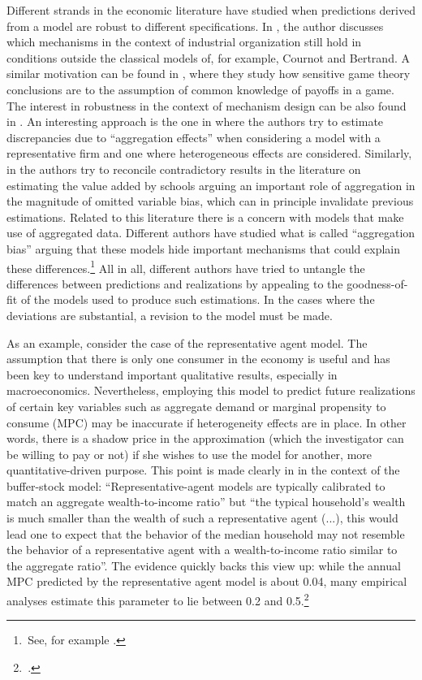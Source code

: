\documentclass[english, a4paper, 12pt]{article}
\begin{document}
Different strands in the economic literature have studied when predictions derived from a model are robust to different specifications. In \cite{SuttonMarketStruct}, the author discusses which mechanisms in the context of industrial organization still hold in conditions outside the classical models of, for example, Cournot and Bertrand. A similar motivation can be found in \cite{Morris97}, where they study how sensitive game theory conclusions are to the assumption of common knowledge of payoffs in a game. The interest in robustness in the context of mechanism design can be also found in \cite{Morris2011}. An interesting approach is the one in \cite{Basu97} where the authors try to estimate discrepancies due to ``aggregation effects'' when considering a model with a representative firm and one where heterogeneous effects are considered. Similarly, in \cite{SchoolAggregation} the authors try to reconcile contradictory results in the literature on estimating the value added by schools arguing an important role of aggregation in the magnitude of omitted variable bias, which can in principle invalidate previous estimations. Related to this literature there is a concern with models that make use of aggregated data. Different authors have studied what is called ``aggregation bias'' arguing that these models hide important mechanisms that could explain these differences.\footnote{\,See, for example \cite{Agg1, Agg2, Agg3, Agg4}.} All in all, different authors have tried to untangle the differences between predictions and realizations by appealing to the goodness-of-fit of the models used to produce such estimations. In the cases where the deviations are substantial, a revision to the model must be made.

As an example, consider the case of the representative agent model. The assumption that there is only one consumer in the economy is useful and has been key to understand important qualitative results, especially in macroeconomics. Nevertheless, employing this model to predict future realizations of certain key variables such as aggregate demand or marginal propensity to consume (MPC) may be inaccurate if heterogeneity effects are in place. In other words, there is a shadow price in the approximation (which the investigator can be willing to pay or not) if she wishes to use the model for another, more quantitative-driven purpose. This point is made clearly in \cite{CarrollRequiem} in the context of the buffer-stock model: ``Representative-agent models are typically calibrated to match an aggregate wealth-to-income ratio'' but ``the typical household’s wealth is much smaller than the wealth of such a representative agent (...), this would lead one to expect that the behavior of the median household may not resemble the behavior of a representative agent with a wealth-to-income ratio similar to the aggregate ratio''. The evidence quickly backs this view up: while the annual MPC predicted by the representative agent model is about 0.04, many empirical analyses estimate this parameter to lie between 0.2 and 0.5.\footnote{\,\cite{CarrollRequiem}.} 
\end{document}

